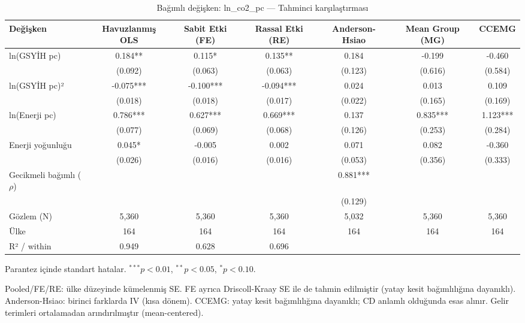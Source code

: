 \documentclass[11pt]{article}
\begin{document}
\begin{table}[t]\centering
\begin{threeparttable}
\caption{Bağımlı değişken: ln\_co2\_pc --- Tahminci karşılaştırması}
\begin{tabular}{lcccccc}
\toprule
Değişken & Havuzlanmış OLS & Sabit Etki (FE) & Rassal Etki (RE) & Anderson-Hsiao & Mean Group (MG) & CCEMG \\
\midrule
ln(GSYİH pc) & 0.184** & 0.115* & 0.135** & 0.184 & -0.199 & -0.460 \\
 & (0.092) & (0.063) & (0.063) & (0.123) & (0.616) & (0.584) \\
ln(GSYİH pc)² & -0.075*** & -0.100*** & -0.094*** & 0.024 & 0.013 & 0.109 \\
 & (0.018) & (0.018) & (0.017) & (0.022) & (0.165) & (0.169) \\
ln(Enerji pc) & 0.786*** & 0.627*** & 0.669*** & 0.137 & 0.835*** & 1.123*** \\
 & (0.077) & (0.069) & (0.068) & (0.126) & (0.253) & (0.284) \\
Enerji yoğunluğu & 0.045* & -0.005 & 0.002 & 0.071 & 0.082 & -0.360 \\
 & (0.026) & (0.016) & (0.016) & (0.053) & (0.356) & (0.333) \\
Gecikmeli bağımlı ($\rho$) &  &  &  & 0.881*** &  &  \\
 &  &  &  & (0.129) &  &  \\
\midrule
Gözlem (N) & 5,360 & 5,360 & 5,360 & 5,032 & 5,360 & 5,360 \\
Ülke & 164 & 164 & 164 & 164 & 164 & 164 \\
R² / within & 0.949 & 0.628 & 0.696 &  &  &  \\
\bottomrule
\end{tabular}
\begin{tablenotes}\footnotesize
\item Parantez içinde standart hatalar. $^{***}p<0.01$, $^{**}p<0.05$, $^{*}p<0.10$.
\item Pooled/FE/RE: ülke düzeyinde kümelenmiş SE. FE ayrıca Driscoll-Kraay SE ile
de tahmin edilmiştir (yatay kesit bağımlılığına dayanıklı). Anderson-Hsiao: birinci
farklarda IV (kısa dönem). CCEMG: yatay kesit bağımlılığına dayanıklı; CD anlamlı
olduğunda esas alınır. Gelir terimleri ortalamadan arındırılmıştır (mean-centered).
\end{tablenotes}
\end{threeparttable}
\end{table}
\end{document}
